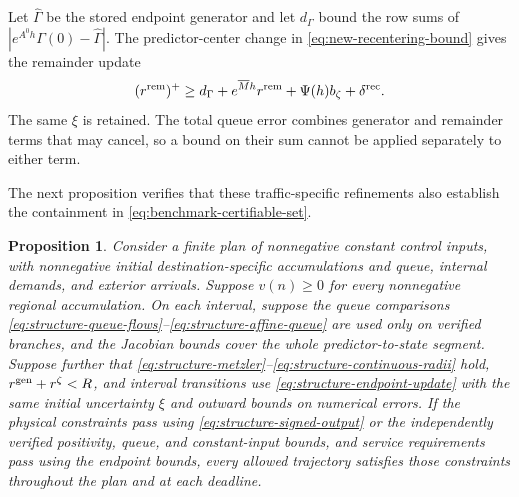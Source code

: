 \documentclass[preprint,12pt]{elsarticle}
\theoremstyle{definition}
\theoremstyle{plain}
\newtheorem{proposition}{Proposition}
\theoremstyle{definition}
\theoremstyle{plain}
\begin{document}
Let $\widehat\Gamma$ be the stored endpoint generator and let $d_\Gamma$
bound the row sums of $|e^{A^0h}\Gamma(0)-\widehat\Gamma|$.
The predictor-center change in \eqref{eq:new-recentering-bound} gives
the remainder update
\begin{equation}
 (r^{\rm rem})^+\ge d_\Gamma+e^{\overline{M}h} r^{\rm rem}+\Psi(h)b_\zeta+\delta^{\rm rec}.
 \label{eq:structure-endpoint-update}
\end{equation}
The same $\xi$ is retained. The total queue error combines generator and
remainder terms that may cancel, so a bound on their sum cannot be applied
separately to either term.

The next proposition verifies that these traffic-specific refinements
also establish the containment in \eqref{eq:benchmark-certifiable-set}.

\begin{proposition}
\label{prop:structure-plan}
Consider a finite plan of nonnegative constant control inputs, with
nonnegative initial destination-specific accumulations and queue, internal
demands, and exterior arrivals. Suppose $v(n)\ge0$ for every nonnegative
regional accumulation. On each interval, suppose the queue comparisons
\eqref{eq:structure-queue-flows}--\eqref{eq:structure-affine-queue} are
used only on verified branches, and the Jacobian bounds cover the whole
predictor-to-state segment. Suppose further that
\eqref{eq:structure-metzler}--\eqref{eq:structure-continuous-radii} hold,
$r^{\rm gen}+r^\zeta<R$, and interval transitions use
\eqref{eq:structure-endpoint-update} with the same initial uncertainty
$\xi$ and outward bounds on numerical errors. If the physical constraints
pass using \eqref{eq:structure-signed-output} or the independently
verified positivity, queue, and constant-input bounds, and service
requirements pass using the endpoint bounds, every allowed trajectory
satisfies those constraints throughout the plan and at each deadline.
\end{proposition}
\end{document}
